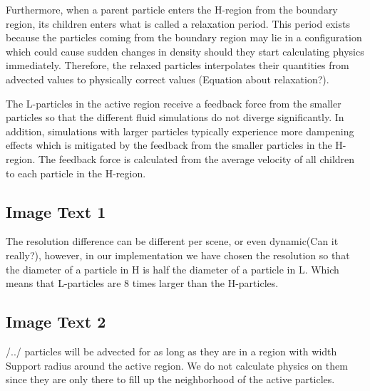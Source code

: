 \documentclass[../../main.tex]{subfiles}
\begin{document}
Furthermore, when a parent particle enters the H-region from the boundary region, its children enters what is called a relaxation period. This period exists because the particles coming from the boundary region may lie in a configuration which could cause sudden changes in density should they start calculating physics immediately. Therefore, the relaxed particles interpolates their quantities from advected values to physically correct values (Equation about relaxation?). 

The L-particles in the active region receive a feedback force from the smaller particles so that the different fluid simulations do not diverge significantly. In addition, simulations with larger particles typically experience more dampening effects which is mitigated by the feedback from the smaller particles in the H-region. The feedback force is calculated from the average velocity of all children to each particle in the H-region. 

\subsection{Image Text 1}
The resolution difference can be different per scene, or even dynamic(Can it really?), however, in our implementation we have chosen the resolution so that the diameter of a particle in H is half the diameter of a particle in L. Which means that L-particles are 8 times larger than the H-particles.

\subsection{Image Text 2}
/../ particles will be advected for as long as they are in a region with width Support radius around the active region. We do not calculate physics on them since they are only there to fill up the neighborhood of the active particles.

\end{document}
